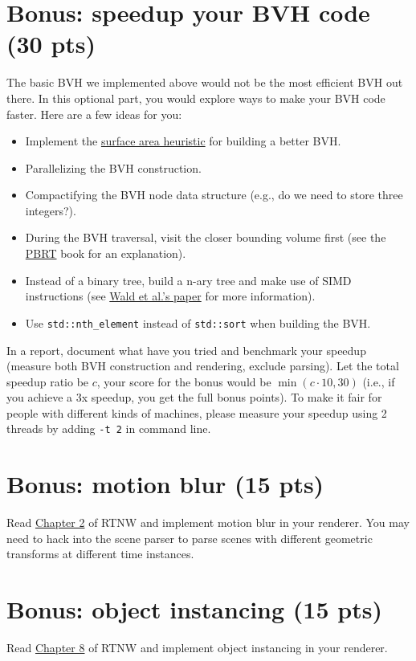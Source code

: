 \section{Bonus: speedup your BVH code (30 pts)}
The basic BVH we implemented above would not be the most efficient BVH out there. In this optional part, you would explore ways to make your BVH code faster. Here are a few ideas for you:
\begin{itemize}
  \item Implement the \href{https://www.pbr-book.org/3ed-2018/Primitives_and_Intersection_Acceleration/Bounding_Volume_Hierarchies#TheSurfaceAreaHeuristic}{surface area heuristic} for building a better BVH.
  \item Parallelizing the BVH construction.
  \item Compactifying the BVH node data structure (e.g., do we need to store three integers?).
  \item During the BVH traversal, visit the closer bounding volume first (see the \href{https://www.pbr-book.org/3ed-2018/Primitives_and_Intersection_Acceleration/Bounding_Volume_Hierarchies#Traversal}{PBRT} book for an explanation).
  \item Instead of a binary tree, build a n-ary tree and make use of SIMD instructions (see \href{http://www.cs.cmu.edu/afs/cs/academic/class/15869-f11/www/readings/wald08_widebvh.pdf}{Wald et al.'s paper} for more information).
  \item Use \lstinline{std::nth_element} instead of \lstinline{std::sort} when building the BVH.
\end{itemize}

In a report, document what have you tried and benchmark your speedup (measure both BVH construction and rendering, exclude parsing).
Let the total speedup ratio be $c$, your score for the bonus would be $\min(c \cdot 10, 30)$ (i.e., if you achieve a 3x speedup, you get the full bonus points).
To make it fair for people with different kinds of machines, please measure your speedup using 2 threads by adding \lstinline{-t 2} in command line.

\section{Bonus: motion blur (15 pts)}
Read \href{https://raytracing.github.io/books/RayTracingTheNextWeek.html#motionblur}{Chapter 2} of RTNW and implement motion blur in your renderer. You may need to hack into the scene parser to parse scenes with different geometric transforms at different time instances.

\section{Bonus: object instancing (15 pts)}
Read \href{https://raytracing.github.io/books/RayTracingTheNextWeek.html#instances}{Chapter 8} of RTNW and implement object instancing in your renderer.

%
%


